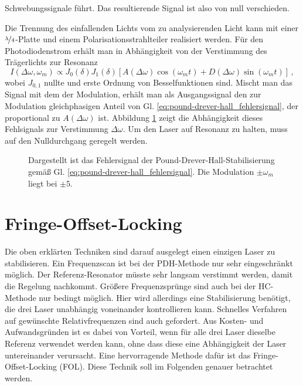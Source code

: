 Schwebungssignale führt. Das resultierende Signal ist also von null
verschieden.\par
Die Trennung des einfallenden Lichts vom zu analysierenden Licht kann mit einer
$\nicefrac{\lambda}{4}$-Platte und einem Polarisationsstrahlteiler realisiert
werden. Für den Photodiodenstrom erhält man in Abhängigkeit von der Verstimmung
des Trägerlichts zur Resonanz
\begin{equation}\label{eq:pound-drever-hall_fehlersignal}
	I(\Delta\omega,\omega_m)\propto
	J_0(\delta)J_1(\delta)\left[A(\Delta\omega)\cos{(\omega_mt)}+D(\Delta\omega)\sin{(\omega_mt)}\right]\,,
\end{equation}
wobei $J_{0,1}$ nullte und erste Ordnung von Besselfunktionen sind. Mischt man
das Signal mit dem der Modulation, erhält man als Ausgangssignal den zur
Modulation gleichphasigen Anteil von
Gl. \eqref{eq:pound-drever-hall_fehlersignal}, der proportional zu
$A(\Delta\omega)$ ist.
Abbildung \ref{fig:pound-drever-hall_fehlersignal} zeigt die Abhängigkeit dieses
Fehlsignals zur Verstimmung $\Delta\omega$. Um den Laser auf Resonanz zu halten,
muss auf den Nulldurchgang geregelt werden.
\begin{figure}[h]
	\centering
	\footnotesize
	
	\caption[Hänsch-Couillaud - Fehlersignal]{Dargestellt ist das Fehlersignal der
	Pound-Drever-Hall-Stabilisierung
	gemäß Gl.
	\eqref{eq:pound-drever-hall_fehlersignal}. Die Modulation 
	$\pm\omega_m$ liegt bei $\pm5$.}\label{fig:pound-drever-hall_fehlersignal}
\end{figure}

\section{Fringe-Offset-Locking}\label{sec:fringe-offset-locking}
Die oben erklärten Techniken sind darauf ausgelegt einen einzigen Laser zu
stabilisieren. Ein Frequenzscan ist bei der PDH-Methode nur sehr eingeschränkt
möglich. Der Referenz-Resonator müsste sehr langsam verstimmt werden, damit die
Regelung nachkommt. Größere Frequenzsprünge sind auch bei der HC-Methode
nur bedingt möglich. Hier wird allerdings eine Stabilisierung benötigt, die drei
Laser unabhängig voneinander kontrollieren kann. Schnelles Verfahren auf
gewünschte Relativfrequenzen sind auch gefordert. Aus Kosten- und
Aufwandsgründen ist es dabei von Vorteil, wenn für alle drei Laser dieselbe
Referenz verwendet werden kann, ohne dass diese eine Abhängigkeit der Laser
untereinander verursacht. Eine hervorragende Methode dafür ist das
Fringe-Offset-Locking (FOL). Diese Technik soll im Folgenden genauer betrachtet
werden.

